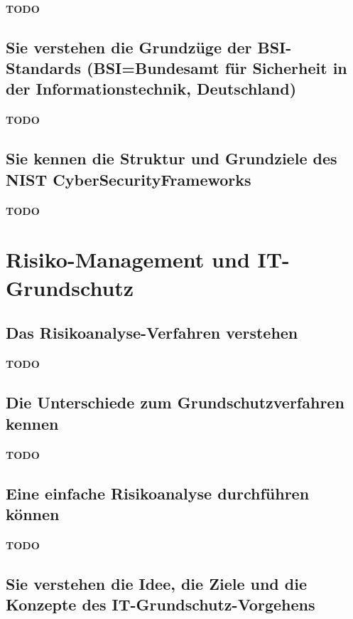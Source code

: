 \documentclass[10pt,a4paper]{article}
\begin{document}
\paragraph*{TODO}
\subsection*{Sie verstehen die Grundzüge der BSI-Standards (BSI=Bundesamt für Sicherheit in der Informationstechnik, Deutschland)}
\paragraph*{TODO}
\subsection*{Sie kennen die Struktur und Grundziele des NIST CyberSecurityFrameworks}
\paragraph*{TODO}


\section{Risiko-Management und IT-Grundschutz}
\subsection*{Das Risikoanalyse-Verfahren verstehen}
\paragraph*{TODO}
\subsection*{Die Unterschiede zum Grundschutzverfahren kennen}
\paragraph*{TODO}
\subsection*{Eine einfache Risikoanalyse durchführen können}
\paragraph*{TODO}
\subsection*{Sie verstehen die Idee, die Ziele und die Konzepte des IT-Grundschutz-Vorgehens}
\end{document}
